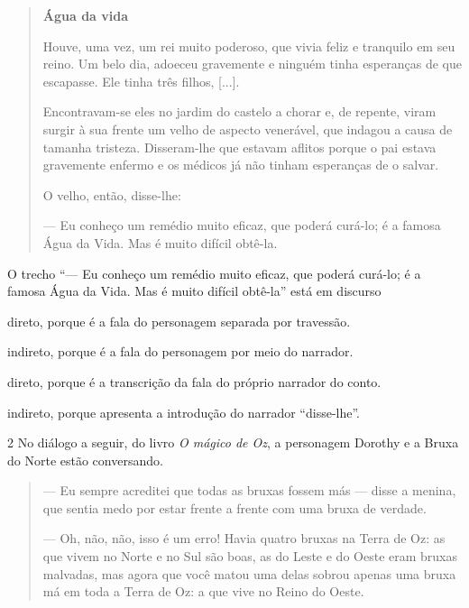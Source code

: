 \begin{conteudo}
\begin{conteudo}
\begin{conteudo}
\begin{conteudo}

\begin{quote}
\textbf{Água da vida}

Houve, uma vez, um rei muito poderoso, que vivia feliz e tranquilo em
seu reino. Um belo dia, adoeceu gravemente e ninguém tinha esperanças de
que escapasse. Ele tinha três filhos, {[}...{]}.

Encontravam-se eles no jardim do castelo a chorar e, de repente, viram
surgir à sua frente um velho de aspecto venerável, que indagou a causa
de tamanha tristeza. Disseram-lhe que estavam aflitos porque o pai
estava gravemente enfermo e os médicos já não tinham esperanças de o
salvar.

O velho, então, disse-lhe:

--- Eu conheço um remédio muito eficaz, que poderá curá-lo; é a famosa
Água da Vida. Mas é muito difícil obtê-la.

\end{quote}

O trecho ``--- Eu conheço um remédio muito eficaz, que poderá curá-lo; é a
famosa Água da Vida. Mas é muito difícil obtê-la'' está em discurso

\begin{escolha}
\item direto, porque é a fala do personagem separada por travessão.

\item indireto, porque é a fala do personagem por meio do narrador.

\item direto, porque é a transcrição da fala do próprio narrador do conto.

\item indireto, porque apresenta a introdução do narrador ``disse-lhe''.
\end{escolha}

\num{2} No diálogo a seguir, do livro \textit{O mágico de Oz}, a personagem
Dorothy e a Bruxa do Norte estão conversando.


\begin{quote}
--- Eu sempre acreditei que todas as bruxas fossem más --- disse a menina,
que sentia medo por estar frente a frente com uma bruxa de verdade.

--- Oh, não, não, isso é um erro! Havia quatro bruxas na Terra de Oz: as
que vivem no Norte e no Sul são boas, as do Leste e do Oeste eram bruxas
malvadas, mas agora que você matou uma delas sobrou apenas uma bruxa má
em toda a Terra de Oz: a que vive no Reino do Oeste.


\end{quote}
\end{conteudo}
\end{conteudo}
\end{conteudo}
\end{conteudo}
